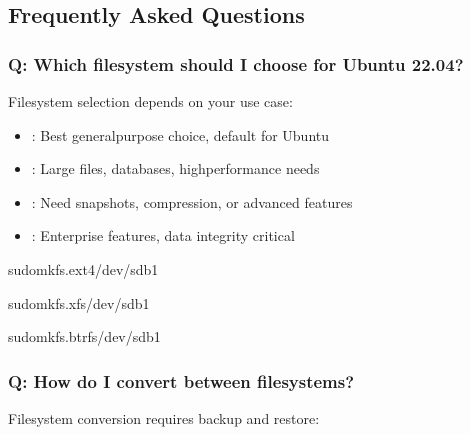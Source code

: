 \documentclass[letterpaper,10pt,english]{sphinxmanual}
\begin{document}
\subsection{Frequently Asked Questions}
\label{\detokenize{file-systems:frequently-asked-questions}}

\subsubsection{Q: Which filesystem should I choose for Ubuntu 22.04?}
\label{\detokenize{file-systems:q-which-filesystem-should-i-choose-for-ubuntu-22-04}}
\sphinxAtStartPar
{} Filesystem selection depends on your use case:
\begin{itemize}
\item {} 
\sphinxAtStartPar
{}: Best general\sphinxhyphen{}purpose choice, default for Ubuntu

\item {} 
\sphinxAtStartPar
{}: Large files, databases, high\sphinxhyphen{}performance needs

\item {} 
\sphinxAtStartPar
{}: Need snapshots, compression, or advanced features

\item {} 
\sphinxAtStartPar
{}: Enterprise features, data integrity critical

\end{itemize}

\begin{sphinxVerbatim}[commandchars=\\\{\}]
sudomkfs.ext4/dev/sdb1

sudomkfs.xfs/dev/sdb1

sudomkfs.btrfs/dev/sdb1
\end{sphinxVerbatim}


\subsubsection{Q: How do I convert between filesystems?}
\label{\detokenize{file-systems:q-how-do-i-convert-between-filesystems}}
\sphinxAtStartPar
{} Filesystem conversion requires backup and restore:
\end{document}
